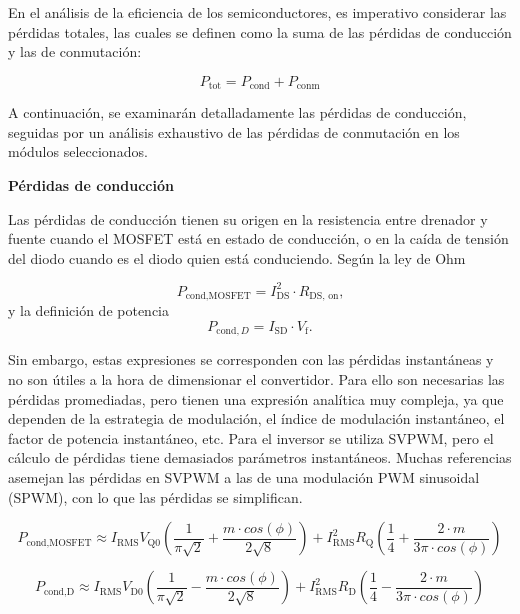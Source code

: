 En el análisis de la eficiencia de los semiconductores, es imperativo considerar las pérdidas totales, las cuales se definen como la suma de las pérdidas de conducción y las de conmutación:

\begin{equation}
	P_{\text{tot}} = P_{\text{cond}} + P_{\text{conm}}
\end{equation}

A continuación, se examinarán detalladamente las pérdidas de conducción, seguidas por un análisis exhaustivo de las pérdidas de conmutación en los módulos seleccionados.


\textbf{Pérdidas de conducción}

Las pérdidas de conducción tienen su origen en la resistencia entre drenador y fuente cuando el MOSFET está en estado de conducción, o en la caída de tensión del diodo cuando es el diodo quien está conduciendo. Según la ley de Ohm 

\begin{equation}
P_{\text{cond,MOSFET}}= I_{\text{DS}}^2\cdot R_{\text{DS, on}}\text{,}
\end{equation}
y la definición de potencia
\begin{equation}
P_{\text{cond},D} = I_{\text{SD}}\cdot V_\text{f}\text{.}
\end{equation}

Sin embargo, estas expresiones se corresponden con las pérdidas instantáneas y no son útiles a la hora de dimensionar el convertidor. Para ello son necesarias las pérdidas promediadas, pero tienen una expresión analítica muy compleja, ya que dependen de la estrategia de modulación, el índice de modulación instantáneo, el factor de potencia instantáneo, etc. Para el inversor se utiliza SVPWM, pero el cálculo de pérdidas tiene demasiados parámetros instantáneos. Muchas referencias asemejan las pérdidas en SVPWM a las de una modulación PWM sinusoidal (SPWM), con lo que las pérdidas se simplifican.

\begin{equation}
P_{\text{cond,MOSFET}} \approx I_{\text{RMS}} V_{\text{Q0}} \left(\frac{1}{\pi\sqrt{2}} + \frac{m\cdot cos(\phi)}{2\sqrt{8}}\right) + I_{\text{RMS}}^2 R_\text{Q} \left(\frac{1}{4} + \frac{2\cdot m}{3\pi\cdot cos(\phi)}\right)
\end{equation}

\begin{equation}
P_{\text{cond,D}} \approx I_{\text{RMS}} V_{\text{D0}} \left(\frac{1}{\pi\sqrt{2}} - \frac{m\cdot cos(\phi)}{2\sqrt{8}}\right) + I_{\text{RMS}}^2 R_\text{D} \left(\frac{1}{4} - \frac{2\cdot m}{3\pi\cdot cos(\phi)}\right)
\end{equation}


